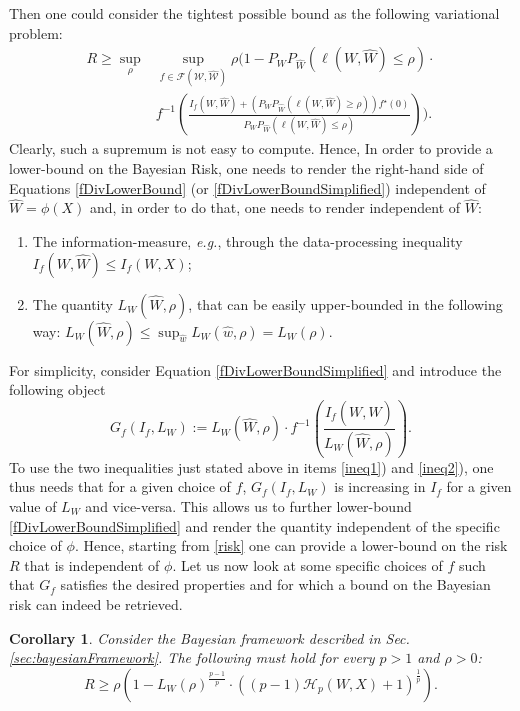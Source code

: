 \documentclass[conference]{IEEEtran}
\theoremstyle{plain}
\newtheorem{corollary}{Corollary}
\theoremstyle{definition}
\theoremstyle{remark}
\newcommand{\W}{\mathcal{W}}
\begin{document}
Then one could consider the tightest possible bound as the following variational problem:
\begin{align}
     R \geq \sup_{\rho}&\!\!\sup_{f\in\mathcal{F}(\W,\hat{\W})}\!\! \rho\bigg(1- P_{W}P_{\hat{W}}(\ell(W,\hat{W})\leq \rho)\cdot \\ &f^{-1}\left(\frac{I_f(W,\hat{W})+(P_{W}P_{\hat{W}}(\ell(W,\hat{W})\geq \rho))f^\star(0)}{P_{W}P_{\hat{W}}(\ell(W,\hat{W})\leq \rho)}\right)\bigg).
\end{align}
Clearly, such a supremum is not easy to compute. Hence,\fi
In order to provide a lower-bound on the Bayesian Risk, one needs to render the right-hand side of Equations \eqref{fDivLowerBound} (or \eqref{fDivLowerBoundSimplified}) independent of $\hat{W}=\phi(X)$ and, in order to do that, one needs to render independent of $\hat{W}$:
\begin{enumerate}
    \item The information-measure, \textit{e.g.}, through the data-processing inequality $I_f(W, \hat{W}) \leq I_f(W, X)$; \label{ineq1}
    \item The quantity $L_W(\hat{W}, \rho)$, that can be easily upper-bounded in the following way: $L_W(\hat{W}, \rho) \leq \sup_{\hat{w}} L_W(\hat{w}, \rho) = L_W(\rho)$. \label{ineq2}
\end{enumerate}
For simplicity, consider Equation \eqref{fDivLowerBoundSimplified} and introduce the following object
\begin{equation}
    G_f(I_f, L_W) := L_W(\hat{W},\rho)\cdot f^{-1}\left(\frac{I_f(W, \hat{W})}{L_W(\hat{W},\rho)}\right).
\end{equation}
To use the two inequalities just stated above in items \ref{ineq1}) and \ref{ineq2}), one thus needs that for a given choice of $f$, $G_f(I_f, L_W)$ is increasing in $I_f$ for a given value of $L_W$ and vice-versa. This allows us to further lower-bound \eqref{fDivLowerBoundSimplified} and render the quantity independent of the specific choice of $\phi$. Hence, starting from \eqref{risk} one can provide a lower-bound on the risk $R$ that is independent of $\phi$.
Let us now look at some specific choices of $f$ such that $G_f$ satisfies the desired properties and for which a bound on the Bayesian risk can indeed be retrieved. 
\begin{corollary}\label{lowerBoundHellinger}
Consider the Bayesian framework described in Sec. \ref{sec:bayesianFramework}. The following must hold for every $p>1$ and $\rho>0$:
\begin{equation}
     R \geq \rho\left(1- L_W(\rho)^{\frac{p-1}{p}}\cdot  \left((p-1) \mathcal{H}_p(W,X) + 1\right) ^\frac{1}{p} \right).
\end{equation}
\end{corollary}
\end{document}
